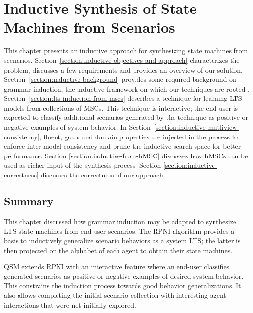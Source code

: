 \chapter{Inductive Synthesis of State Machines from Scenarios\label{chapter:inductive-synthesis}}

This chapter presents an inductive approach for synthesizing state machines from scenarios. Section~\ref{section:inductive-objectives-and-approach} characterizes the problem, discusses a few requirements and provides an overview of our solution. Section~\ref{section:inductive-background} provides some required background on grammar induction, the inductive framework on which our techniques are rooted \cite{Gold:1978}. Section~\ref{section:lts-induction-from-mscs} describes a technique for learning LTS models from collections of MSCs. This technique is interactive; the end-user is expected to classify additional scenarios generated by the technique as positive or negative examples of system behavior. In Section~\ref{section:inductive-mutliview-consistency}, fluent, goals and domain properties are injected in the process to enforce inter-model consistency and prune the inductive search space for better performance. Section \ref{section:inductive-from-hMSC} discusses how hMSCs can be used as richer input of the synthesis process. Section \ref{section:inductive-correctness} discusses the correctness of our approach.









\section*{Summary}

This chapter discussed how grammar induction may be adapted to synthesize LTS state machines from end-user scenarios. The RPNI algorithm provides a basis to inductively generalize scenario behaviors as a system LTS; the latter is then projected on the alphabet of each agent to obtain their state machines.

QSM extends RPNI with an interactive feature where an end-user classifies generated scenarios as positive or negative examples of desired system behavior. This constrains the induction process towards good behavior generalizations. It also allows completing the initial scenario collection with interesting agent interactions that were not initially explored.

